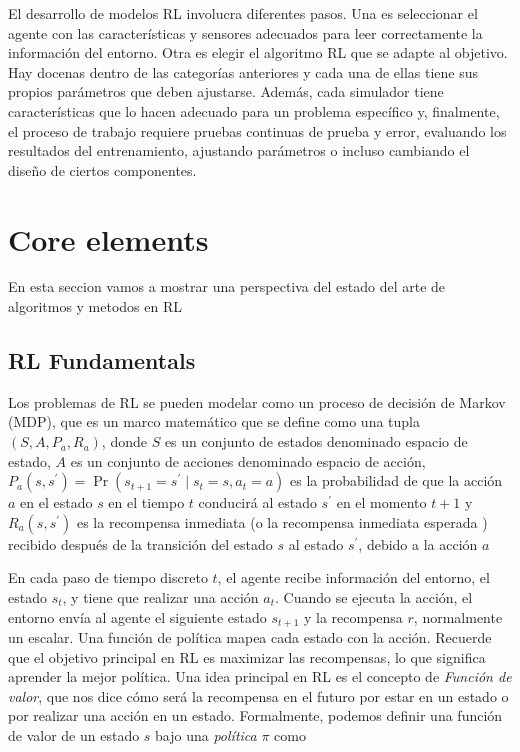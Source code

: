 \documentclass{svproc}
\begin{document}
El desarrollo de modelos RL involucra diferentes pasos. Una es seleccionar el agente con las características y sensores adecuados para leer correctamente la información del entorno. Otra es elegir el algoritmo RL que se adapte al objetivo. Hay docenas dentro de las categorías anteriores y cada una de ellas tiene sus propios parámetros que deben ajustarse. Además, cada simulador tiene características que lo hacen adecuado para un problema específico y, finalmente, el proceso de trabajo requiere pruebas continuas de prueba y error, evaluando los resultados del entrenamiento, ajustando parámetros o incluso cambiando el diseño de ciertos componentes.

\section{Core elements}\label{ch:core}
En esta seccion vamos a mostrar una perspectiva del estado del arte de algoritmos y metodos en RL

\subsection{RL Fundamentals}\label{ss:rl_fundamentals}
Los problemas de RL se pueden modelar como un proceso de decisión de Markov (MDP), que es un marco matemático que se define como una tupla $\left(S, A, P_{a}, R_{a}\right)$, donde $S$ es un conjunto de estados denominado espacio de estado, $A$ es un conjunto de acciones denominado espacio de acción, $P_{a}\left(s, s^{\prime}\right)=\operatorname{Pr}\left (s_{t+1}=s^{\prime} \mid s_{t}=s, a_{t}=a\right)$ es la probabilidad de que la acción $a$ en el estado $s$ en el tiempo $t $ conducirá al estado $s^{\prime}$ en el momento $t+1$ y $R_{a}\left(s, s^{\prime}\right)$ es la recompensa inmediata (o la recompensa inmediata esperada ) recibido después de la transición del estado $s$ al estado $s^{\prime}$, debido a la acción $a$

En cada paso de tiempo discreto $t$, el agente recibe información del entorno, el estado $s_t$, y tiene que realizar una acción $a_t$. Cuando se ejecuta la acción, el entorno envía al agente el siguiente estado $s_{t+1}$ y la recompensa $r$, normalmente un escalar. Una función de política mapea cada estado con la acción. Recuerde que el objetivo principal en RL es maximizar las recompensas, lo que significa aprender la mejor política.
Una idea principal en RL es el concepto de \textit{Función de valor}, que nos dice cómo será la recompensa en el futuro por estar en un estado o por realizar una acción en un estado.
Formalmente, podemos definir una función de valor de un estado $s$ bajo una \textit{política} $\pi$ como \newline
\end{document}
